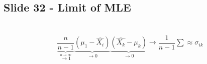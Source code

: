 \subsection{Slide 32 - Limit of MLE}\hfill\\
\begin{equation*}
  \begin{gathered}
    \underbrace{\dfrac{n}{n-1}}_{\stackrel{n\to\infty}{\to1}}\underbrace{(\mu_1-\hat{X_i})}_{\text{$\to0$}}\underbrace{(\hat{X_k}-\mu_k)}_{\text{$\to0$}}\to\dfrac{1}{n-1}\sum\approx \sigma_{ik}
  \end{gathered}
\end{equation*}
